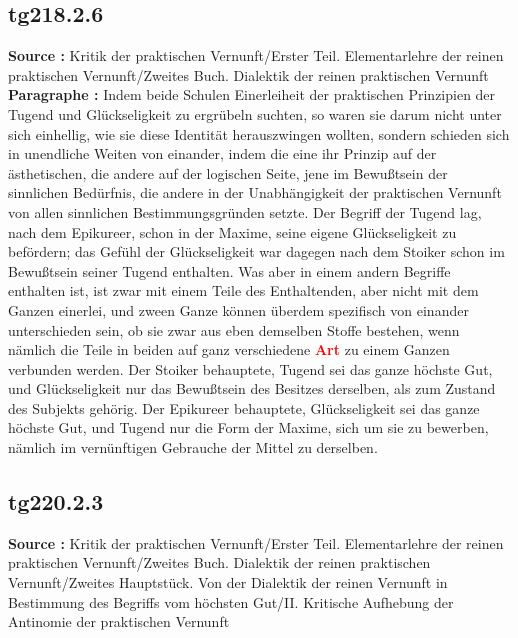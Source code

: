 \documentclass[a4paper,12pt,twoside]{book}
\newcommand{\match}[1]{\textcolor{red}{\textbf{#1}}}
\begin{document}
	\subsection*{tg218.2.6} 
	\textbf{Source : }Kritik der praktischen Vernunft/Erster Teil. Elementarlehre der reinen praktischen Vernunft/Zweites Buch. Dialektik der reinen praktischen Vernunft\\  
	
	\noindent\textbf{Paragraphe : }Indem beide Schulen Einerleiheit der praktischen Prinzipien der Tugend und Glückseligkeit zu ergrübeln suchten, so waren sie darum nicht unter sich einhellig, wie sie diese Identität herauszwingen wollten, sondern schieden sich in unendliche Weiten von einander, indem die eine ihr Prinzip auf der ästhetischen, die andere auf der logischen Seite, jene im Bewußtsein der sinnlichen Bedürfnis, die andere in der Unabhängigkeit der praktischen Vernunft von allen sinnlichen Bestimmungsgründen setzte. Der Begriff der Tugend lag, nach dem Epikureer, schon in der Maxime, seine eigene Glückseligkeit zu befördern; das Gefühl der Glückseligkeit war dagegen nach dem Stoiker schon im Bewußtsein seiner Tugend enthalten. Was aber in einem andern Begriffe enthalten ist, ist zwar mit einem Teile des Enthaltenden, aber nicht mit dem Ganzen einerlei, und zween Ganze können überdem spezifisch von einander unterschieden sein, ob sie zwar aus eben demselben Stoffe bestehen, wenn nämlich die Teile in beiden auf ganz verschiedene \match{Art} zu einem  Ganzen verbunden werden. Der Stoiker behauptete, Tugend sei das ganze höchste Gut, und Glückseligkeit nur das Bewußtsein des Besitzes derselben, als zum Zustand des Subjekts gehörig. Der Epikureer behauptete, Glückseligkeit sei das ganze höchste Gut, und Tugend nur die Form der Maxime, sich um sie zu bewerben, nämlich im vernünftigen Gebrauche der Mittel zu derselben. 
	
	\subsection*{tg220.2.3} 
	\textbf{Source : }Kritik der praktischen Vernunft/Erster Teil. Elementarlehre der reinen praktischen Vernunft/Zweites Buch. Dialektik der reinen praktischen Vernunft/Zweites Hauptstück. Von der Dialektik der reinen Vernunft in Bestimmung des Begriffs vom höchsten Gut/II. Kritische Aufhebung der Antinomie der praktischen Vernunft\\  
	
\end{document}
